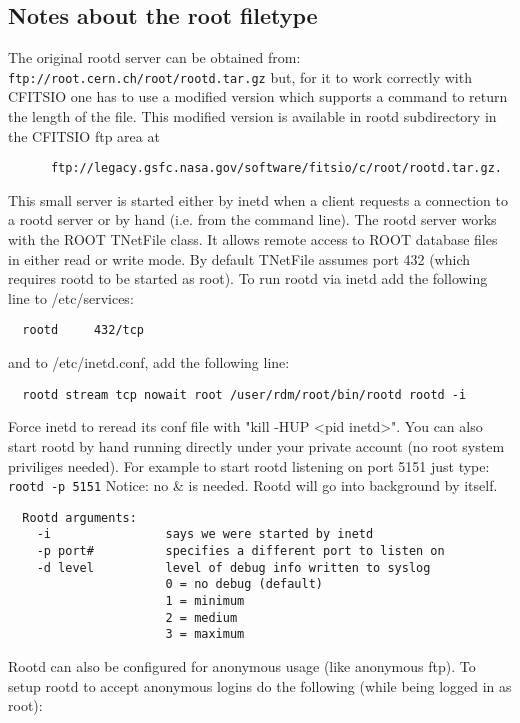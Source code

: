 \documentclass[11pt]{book}
\begin{document}
\subsection{Notes about the root filetype}

The original rootd server can be obtained from:
\verb-ftp://root.cern.ch/root/rootd.tar.gz-
but, for it to work correctly with CFITSIO one has to use a modified
version which supports a command to return the length of the file.
This modified version is available in rootd subdirectory
in the CFITSIO ftp area at

\begin{verbatim}
      ftp://legacy.gsfc.nasa.gov/software/fitsio/c/root/rootd.tar.gz.
\end{verbatim}

This small server is started either by inetd when a client requests a
connection to a rootd server or by hand (i.e. from the command line).
The rootd server works with the ROOT TNetFile class. It allows remote
access to ROOT database files in either read or write mode. By default
TNetFile assumes port 432 (which requires rootd to be started as root).
To run rootd via inetd add the following line to /etc/services:

\begin{verbatim}
  rootd     432/tcp
\end{verbatim}
and to /etc/inetd.conf, add the following line:

\begin{verbatim}
  rootd stream tcp nowait root /user/rdm/root/bin/rootd rootd -i
\end{verbatim}
Force inetd to reread its conf file with "kill -HUP <pid inetd>".
You can also start rootd by hand running directly under your private
account (no root system priviliges needed). For example to start
rootd listening on port 5151 just type:   \verb+rootd -p 5151+
Notice: no \& is needed. Rootd will go into background by itself.

\begin{verbatim}
  Rootd arguments:
    -i                says we were started by inetd
    -p port#          specifies a different port to listen on
    -d level          level of debug info written to syslog
                      0 = no debug (default)
                      1 = minimum
                      2 = medium
                      3 = maximum
\end{verbatim}
Rootd can also be configured for anonymous usage (like anonymous ftp).
To setup rootd to accept anonymous logins do the following (while being
logged in as root):
\end{document}
